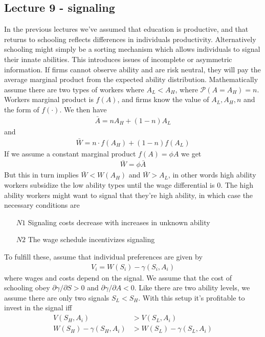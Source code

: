\documentclass[12pt, a4paper]{article}
\begin{document}
\begin{multicols}{2}
\subsection{Lecture 9 - signaling}
In the previous lectures we've assumed that education is productive, and that returns to schooling reflects differences in individuals productivity. Alternatively schooling might simply be a sorting mechanism which allows individuals to signal their innate abilities. This introduces issues of incomplete or asymmetric information. If firms cannot observe ability and are risk neutral, they will pay the average marginal product from the expected ability distribution. Mathematically assume there are two types of workers where $A_L < A_H$, where $\mathcal{P}(A=A_H)=n$. Workers marginal product is $f(A)$, and firms know the value of $A_L,A_H, n$ and the form of $f(\cdot)$. We then have
\begin{align*}
\bar{A} = nA_H + (1-n) A_L
\end{align*}
and
\begin{align*}
\bar{W} = n \cdot f(A_H) +(1-n)f(A_L)
\end{align*}
If we assume a constant marginal product $f(A) = \phi A$ we get
\begin{align*}
\bar{W} = \phi \bar{A}
\end{align*}
But this in turn implies $\bar{W}<W(A_H)$ and $\bar{W}>A_L$, in other words high ability workers subsidize the low ability types until the wage differential is 0. The high ability workers might want to signal that they're high ability, in which case the necessary conditions are
\begin{itemize}
\item[$N1$] Signaling costs decrease with increases in unknown ability
\item[$N2$] The wage schedule incentivizes signaling
\end{itemize}
To fulfill these, assume that individual preferences are given by
\begin{align*}
V_i = W(S_i)-\gamma(S_i,A_i)
\end{align*}
where wages and costs depend on the signal. We assume that the cost of schooling obey $\partial \gamma /\partial S>0$ and $\partial \gamma /\partial A<0$. Like there are two ability levels, we assume there are only two signals $S_L<S_H$. With this setup it's profitable to invest in the signal iff
\begin{align*}
V(S_H,A_i)&>V(S_L,A_i) \\
W(S_H)-\gamma(S_H,A_i)&>W(S_L)-\gamma(S_L,A_i)

\end{align*}
\end{multicols}
\end{document}
